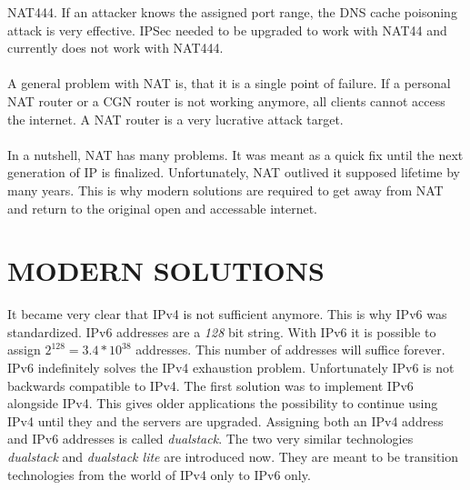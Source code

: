 \documentclass[format=sigconf, natbib=true, nonacm=true]{acmart}
\begin{document}
NAT444. If an attacker knows the assigned port range, the DNS cache poisoning attack is very effective. IPSec needed to be upgraded to work with NAT44 and currently does not work with NAT444\cite{Hughes2022_C04}.\\\\A general problem with NAT is, that it is a single point of failure. If a personal NAT router or a CGN router is not working anymore, all clients cannot access the internet. A NAT router is a very lucrative attack target\cite{Hughes2022_C04}.\\\\In a nutshell, NAT has many problems. It was meant as a quick fix until the next generation of IP is finalized. Unfortunately, NAT outlived it supposed lifetime by many years. This is why modern solutions are required to get away from NAT and return to the original open and accessable internet.
    \section{MODERN SOLUTIONS}
    It became very clear that IPv4 is not sufficient anymore. This is why IPv6 was standardized. IPv6 addresses are a \textit{128} bit string. With IPv6 it is possible to assign $2^{128}=3.4*10^{38}$ addresses. This number of addresses will suffice forever. IPv6 indefinitely solves the IPv4 exhaustion problem. Unfortunately IPv6 is not backwards compatible to IPv4. The first solution was to implement IPv6 alongside IPv4. This gives older applications the possibility to continue using IPv4 until they and the servers are upgraded. Assigning both an IPv4 address and IPv6 addresses is called \textit{dualstack}. The two very similar technologies \textit{dualstack} and \textit{dualstack lite} are introduced now. They are meant to be transition technologies from the world of IPv4 only to IPv6 only.
\end{document}
